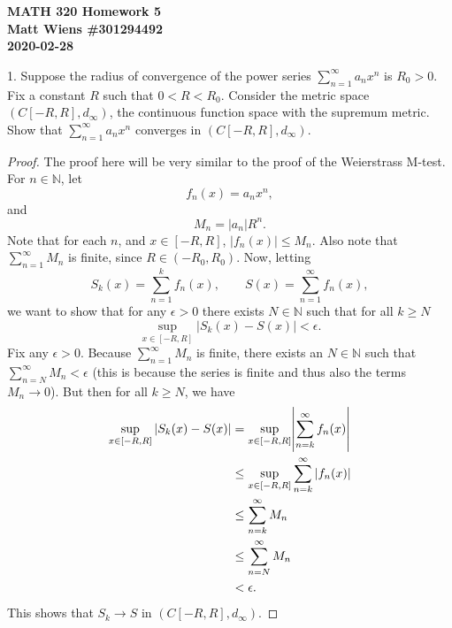 \documentclass{article}
\newcommand{\N}{\mathbb{N}}
\begin{document}
\textbf{MATH 320 Homework 5} \\
\textbf{Matt Wiens \#301294492} \\
\textbf{2020-02-28}

1. Suppose the radius of convergence of the power series $\sum_{n =
   1}^\infty a_n x^n$ is $R_0 > 0$. Fix a constant $R$ such that $0 < R
   < R_0$. Consider the metric space $(C[-R, R], d_\infty)$, the
   continuous function space with the supremum metric. Show that
   $\sum_{n = 1}^\infty a_n x^n$ converges in $(C[-R, R], d_\infty)$.

\begin{proof}

The proof here will be very similar to the proof of the Weierstrass M-test.
For $n \in \N$, let
%
\begin{equation*}
    f_n(x) = a_n x^n
    ,
\end{equation*}
%
and
%
\begin{equation*}
    M_n = |a_n| R^n
    .
\end{equation*}
%
Note that for each $n$, and $x \in [-R, R]$, $|f_n(x)| \leq M_n$. Also
note that $\sum_{n = 1}^\infty M_n$ is finite, since $R \in (-R_0,
R_0)$. Now, letting
%
\begin{equation*}
    S_k(x) = \sum_{n = 1}^k f_n(x), \qquad S(x) = \sum_{n = 1}^\infty f_n(x),
\end{equation*}
%
we want to show that for any $\epsilon > 0$ there exists $N \in \N$ such
that for all $k \geq N$
%
\begin{equation*}
    \sup_{x \in [-R, R]}|S_k(x) - S(x)| < \epsilon
    .
\end{equation*}
%
Fix any $\epsilon > 0$. Because $\sum_{n = 1}^\infty M_n$ is finite,
there exists an $N \in \N$ such that $\sum_{n = N}^\infty M_n <
\epsilon$ (this is because the series is finite and thus also the terms
$M_n \to 0$). But then for all $k \geq N$, we have
%
\begin{align*}
    \sup_{x \in [-R, R]} |S_k(x) - S(x)|
        &= \sup_{x \in [-R, R]} \envert{\sum_{n = k}^\infty f_n(x)} \\
        &\leq \sup_{x \in [-R, R]} \sum_{n = k}^\infty |f_n(x)| \\
        &\leq \sum_{n = k}^\infty M_n \\
        &\leq \sum_{n = N}^\infty M_n \\
        &< \epsilon
        .
\end{align*}
%
This shows that $S_k \to S$ in $(C[-R, R], d_\infty)$.


\end{proof}
\end{document}
